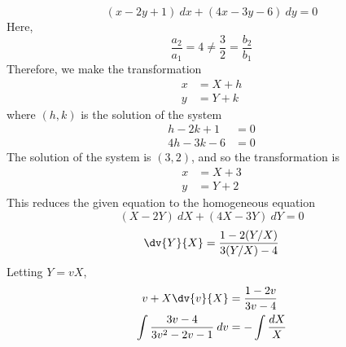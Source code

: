 \begin{example}{\[
        (x - 2y + 1) \: d{x} + (4x - 3y - 6) \: d{y} = 0
\]}{} \vspace{-20pt}
    Here, \[
        \frac{a_2}{a_1} = 4 \neq \frac{3}{2} = \frac{b_2}{b_1}
    \] Therefore, we make the transformation
    \begin{align*}
        x &= X + h \\
        y &= Y + k
    \end{align*}
    where $(h,k)$ is the solution of the system
    \begin{align*}
        h - 2k + 1 &= 0 \\
        4h - 3k - 6 &= 0
    \end{align*}
    The solution of the system is $(3,2)$, and so the transformation is
    \begin{align*}
        x &= X + 3 \\
        y &= Y + 2
    \end{align*}
    This reduces the given equation to the homogeneous equation
    \[ (X-2Y) \: d{X} + (4X-3Y) \: d{Y} = 0 \]
    \[ \dv{Y}{X} = \frac{1 - 2(Y/X)}{3(Y/X) - 4} \]
    Letting $Y = vX$,
    \begin{align*}
        v + X\dv{v}{X} &= \frac{1-2v}{3v-4} \\
        \int{ \frac{3v-4}{3v^2-2v-1} } \: d{v} &= -\int{ \frac{dX}{X} }
    \end{align*}
\end{example}














